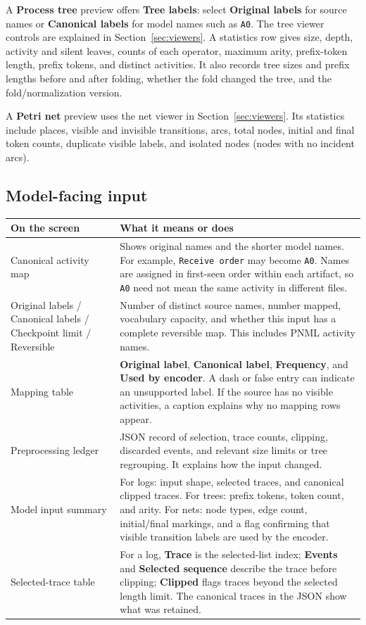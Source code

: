 \documentclass[11pt,a4paper]{article}
\makeatletter
\newcommand{\ui}[1]{\textbf{#1}}
\newcommand{\code}[1]{\nolinkurl{#1}}
\newenvironment{controls}{%
  \small\begin{longtable}{@{}>{\raggedright\arraybackslash}p{.34\linewidth}
    >{\raggedright\arraybackslash}p{.62\linewidth}@{}}
  \toprule\textbf{On the screen} & \textbf{What it means or does}\\\midrule\endhead
  \bottomrule\endfoot
}{\end{longtable}\normalsize}
\makeatother
\begin{document}
A \ui{Process tree} preview offers \ui{Tree labels}: select
\ui{Original labels} for source names or \ui{Canonical labels} for model
names such as \code{A0}. The tree viewer controls are explained in
Section~\ref{sec:viewers}. A statistics row gives size, depth, activity and
silent leaves, counts of each operator, maximum arity, prefix-token length,
prefix tokens, and distinct activities. It also records tree sizes and prefix
lengths before and after folding, whether the fold changed the tree, and the
fold/normalization version.

A \ui{Petri net} preview uses the net viewer in Section~\ref{sec:viewers}.
Its statistics include places, visible and invisible transitions, arcs, total
nodes, initial and final token counts, duplicate visible labels, and isolated
nodes (nodes with no incident arcs).

\subsection{Model-facing input}
\begin{controls}
Canonical activity map & Shows original names and the shorter model names.
For example, \code{Receive order} may become \code{A0}. Names are assigned in
first-seen order within each artifact, so \code{A0} need not mean the same
activity in different files.\\
Original labels / Canonical labels / Checkpoint limit / Reversible & Number of
distinct source names, number mapped, vocabulary capacity, and whether this
input has a complete reversible map. This includes PNML activity names.\\
Mapping table & \ui{Original label}, \ui{Canonical label}, \ui{Frequency},
and \ui{Used by encoder}. A dash or false entry can indicate an unsupported
label. If the source has no visible activities, a caption explains why no
mapping rows appear.\\
Preprocessing ledger & JSON record of selection, trace counts, clipping,
discarded events, and relevant size limits or tree regrouping. It explains
how the input changed.\\
Model input summary & For logs: input shape, selected traces, and canonical
clipped traces. For trees: prefix tokens, token count, and arity. For nets:
node types, edge count, initial/final markings, and a flag confirming that
visible transition labels are used by the encoder.\\
Selected-trace table & For a log, \ui{Trace} is the selected-list index;
\ui{Events} and \ui{Selected sequence} describe the trace before clipping;
\ui{Clipped} flags traces beyond the selected length limit. The canonical
traces in the JSON show what was retained.\\
\end{controls}
\end{document}
